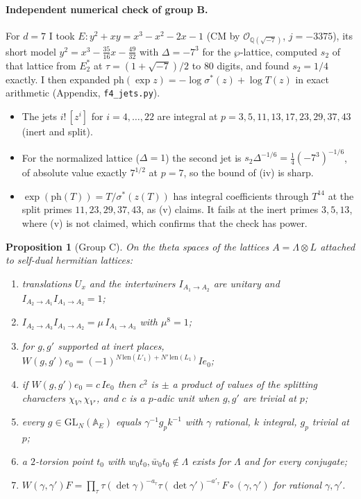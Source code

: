 \documentclass[11pt]{article}
\newtheorem{proposition}[theorem]{Proposition}
\theoremstyle{remark}
\begin{document}
\paragraph{Independent numerical check of group B.} For $d=7$ I took $E:y^2+xy=x^3-x^2-2x-1$ (CM by $\mathcal O_{\mathbb Q(\sqrt{-7})}$, $j=-3375$), its short model $y^2=x^3-\tfrac{35}{16}x-\tfrac{49}{32}$ with $\Delta=-7^3$ for the $\wp$-lattice, computed $s_2$ of that lattice from $E_2^*$ at $\tau=(1+\sqrt{-7})/2$ to $80$ digits, and found $s_2=1/4$ exactly. I then expanded $\mathrm{ph}(\exp z)=-\log\sigma^*(z)+\log T(z)$ in exact arithmetic (Appendix, \texttt{f4\_jets.py}).
\begin{itemize}[nosep]
\item The jets $i!\,[z^i]$ for $i=4,\dots,22$ are integral at $p=3,5,11,13,17,23,29,37,43$ (inert and split).
\item For the normalized lattice ($\Delta=1$) the second jet is $s_2\Delta^{-1/6}=\tfrac14(-7^3)^{-1/6}$, of absolute value exactly $7^{1/2}$ at $p=7$, so the bound of (iv) is sharp.
\item $\exp(\mathrm{ph}(T))=T/\sigma^*(z(T))$ has integral coefficients through $T^{14}$ at the split primes $11,23,29,37,43$, as (v) claims. It fails at the inert primes $3,5,13$, where (v) is not claimed, which confirms that the check has power.
\end{itemize}

\begin{proposition}[Group C]\label{prop:f4c}
On the theta spaces of the lattices $A=\Lambda\otimes L$ attached to self-dual hermitian lattices:
\begin{enumerate}[label=(\roman*),nosep]
\item translations $U_x$ and the intertwiners $I_{A_1\to A_2}$ are unitary and $I_{A_2\to A_1}I_{A_1\to A_2}=1$;
\item $I_{A_2\to A_3}I_{A_1\to A_2}=\mu\,I_{A_1\to A_3}$ with $\mu^8=1$;
\item for $g,g'$ supported at inert places, $W(g,g')e_0=(-1)^{N\,\mathrm{len}(L'_1)+N'\,\mathrm{len}(L_1)}I e_0$;
\item if $W(g,g')e_0=c\,Ie_0$ then $c^2$ is $\pm$ a product of values of the splitting characters $\chi_V,\chi_{V'}$, and $c$ is a $p$-adic unit when $g,g'$ are trivial at $p$;
\item every $g\in\mathrm{GL}_N(\mathbb A_E)$ equals $\gamma^{-1}g_pk^{-1}$ with $\gamma$ rational, $k$ integral, $g_p$ trivial at $p$;
\item a $2$-torsion point $t_0$ with $w_0t_0,\bar w_0t_0\notin\Lambda$ exists for $\Lambda$ and for every conjugate;
\item $W(\gamma,\gamma')F=\prod_\tau\tau(\det\gamma)^{-a_\tau}\tau(\det\gamma')^{-a'_\tau}\,F\circ(\gamma,\gamma')$ for rational $\gamma,\gamma'$.
\end{enumerate}
\end{proposition}
\end{document}
